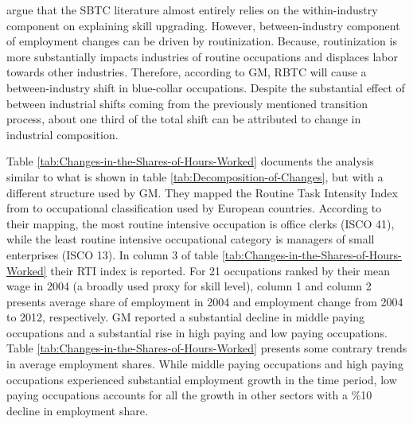 \begin{onehalfspace}
\citet[hereafter, GM]{2014Goos} argue that the SBTC literature almost
entirely relies on the within-industry component on explaining skill
upgrading. However, between-industry component of employment changes
can be driven by routinization. Because, routinization is more substantially
impacts industries of routine occupations and displaces labor towards
other industries. Therefore, according to GM, RBTC will cause a between-industry
shift in blue-collar occupations. Despite the substantial effect of
between industrial shifts coming from the previously mentioned transition
process, about one third of the total shift can be attributed to change
in industrial composition.

Table \ref{tab:Changes-in-the-Shares-of-Hours-Worked} documents the
analysis similar to what is shown in table \ref{tab:Decomposition-of-Changes},
but with a different structure used by GM. They mapped the Routine
Task Intensity Index from \citet{2013Autor} to occupational classification
used by European countries. According to their mapping, the most routine
intensive occupation is office clerks (ISCO 41), while the least routine
intensive occupational category is managers of small enterprises (ISCO
13). In column 3 of table \ref{tab:Changes-in-the-Shares-of-Hours-Worked}
their RTI index is reported. For 21 occupations ranked by their mean
wage in 2004 (a broadly used proxy for skill level), column 1 and
column 2 presents average share of employment in 2004 and employment
change from 2004 to 2012, respectively. GM reported a substantial
decline in middle paying occupations and a substantial rise in high
paying and low paying occupations. Table \ref{tab:Changes-in-the-Shares-of-Hours-Worked}
presents some contrary trends in average employment shares. While
middle paying occupations and high paying occupations experienced
substantial employment growth in the time period, low paying occupations
accounts for all the growth in other sectors with a \%10 decline in
employment share.
\end{onehalfspace}
\begin{center}

\par\end{center}

\vspace{-1cm}
\begin{center}
\par\end{center}

